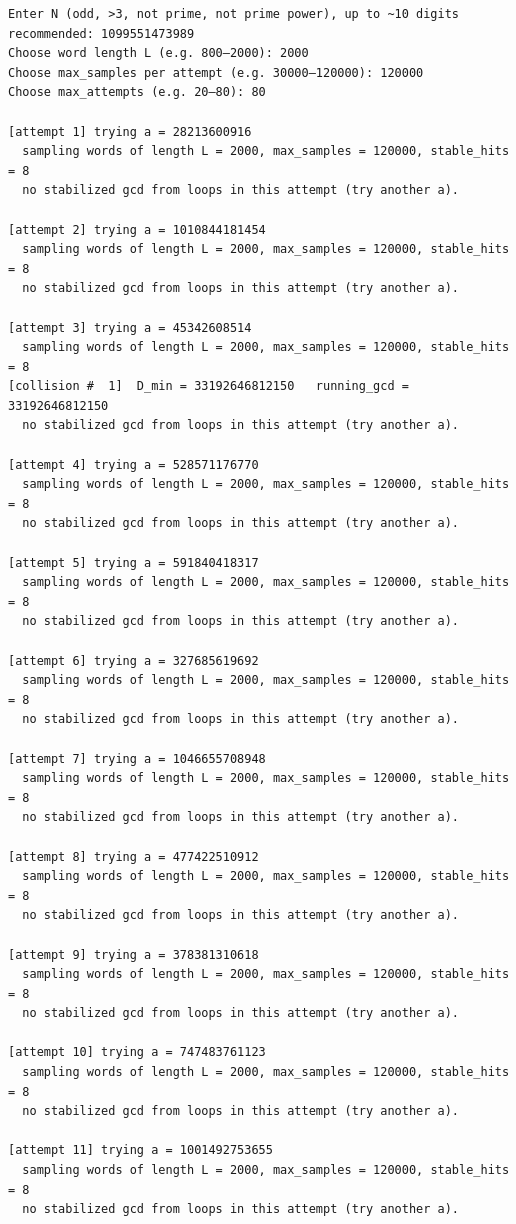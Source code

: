 \documentclass[11pt,reqno]{article}
\numberwithin{equation}{section}
\theoremstyle{plain}
\theoremstyle{definition}
\theoremstyle{remark}
\begin{document}
\begin{verbatim}
Enter N (odd, >3, not prime, not prime power), up to ~10 digits recommended: 1099551473989
Choose word length L (e.g. 800–2000): 2000
Choose max_samples per attempt (e.g. 30000–120000): 120000
Choose max_attempts (e.g. 20–80): 80

[attempt 1] trying a = 28213600916
  sampling words of length L = 2000, max_samples = 120000, stable_hits = 8
  no stabilized gcd from loops in this attempt (try another a).

[attempt 2] trying a = 1010844181454
  sampling words of length L = 2000, max_samples = 120000, stable_hits = 8
  no stabilized gcd from loops in this attempt (try another a).

[attempt 3] trying a = 45342608514
  sampling words of length L = 2000, max_samples = 120000, stable_hits = 8
[collision #  1]  D_min = 33192646812150   running_gcd = 33192646812150
  no stabilized gcd from loops in this attempt (try another a).

[attempt 4] trying a = 528571176770
  sampling words of length L = 2000, max_samples = 120000, stable_hits = 8
  no stabilized gcd from loops in this attempt (try another a).

[attempt 5] trying a = 591840418317
  sampling words of length L = 2000, max_samples = 120000, stable_hits = 8
  no stabilized gcd from loops in this attempt (try another a).

[attempt 6] trying a = 327685619692
  sampling words of length L = 2000, max_samples = 120000, stable_hits = 8
  no stabilized gcd from loops in this attempt (try another a).

[attempt 7] trying a = 1046655708948
  sampling words of length L = 2000, max_samples = 120000, stable_hits = 8
  no stabilized gcd from loops in this attempt (try another a).

[attempt 8] trying a = 477422510912
  sampling words of length L = 2000, max_samples = 120000, stable_hits = 8
  no stabilized gcd from loops in this attempt (try another a).

[attempt 9] trying a = 378381310618
  sampling words of length L = 2000, max_samples = 120000, stable_hits = 8
  no stabilized gcd from loops in this attempt (try another a).

[attempt 10] trying a = 747483761123
  sampling words of length L = 2000, max_samples = 120000, stable_hits = 8
  no stabilized gcd from loops in this attempt (try another a).

[attempt 11] trying a = 1001492753655
  sampling words of length L = 2000, max_samples = 120000, stable_hits = 8
  no stabilized gcd from loops in this attempt (try another a).


\end{verbatim}
\end{document}
